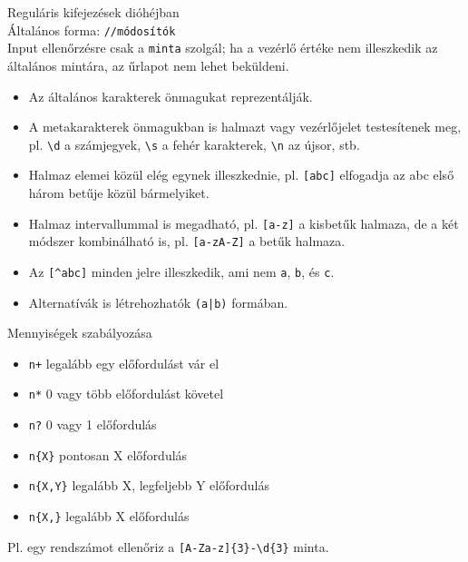 \begin{frame}
  Reguláris kifejezések dióhéjban\\
  \vfill
  Általános forma: \texttt{//módosítók}\\
  Input ellenőrzésre csak a \texttt{minta} szolgál; ha a vezérlő értéke nem illeszkedik az általános mintára, az űrlapot nem lehet beküldeni.\\
  \begin{itemize}
    \item Az általános karakterek önmagukat reprezentálják.
    \item A metakarakterek önmagukban is halmazt vagy vezérlőjelet testesítenek meg, pl. \texttt{\textbackslash d} a számjegyek, \texttt{\textbackslash s} a fehér karakterek, \texttt{\textbackslash n} az újsor, stb.
    \item Halmaz elemei közül elég egynek illeszkednie, pl. \texttt{[abc]} elfogadja az abc első három betűje közül bármelyiket.
    \item Halmaz intervallummal is megadható, pl. \texttt{[a-z]} a kisbetűk halmaza, de a két módszer kombinálható is, pl. \texttt{[a-zA-Z]} a betűk halmaza.
    \item Az \texttt{[\textasciicircum abc]} minden jelre illeszkedik, ami nem \texttt{a}, \texttt{b}, és \texttt{c}.
    \item Alternatívák is létrehozhatók \texttt{(a|b)} formában.
  \end{itemize}  
\end{frame}

\begin{frame}
  Mennyiségek szabályozása
  \medskip
  \begin{itemize}
    \item \texttt{n+} legalább egy előfordulást vár el
    \item \texttt{n*} 0 vagy több előfordulást követel
    \item \texttt{n?} 0 vagy 1 előfordulás
    \item \texttt{n\{X\}} pontosan X előfordulás
    \item \texttt{n\{X,Y\}} legalább X, legfeljebb Y előfordulás
    \item \texttt{n\{X,\}} legalább X előfordulás
  \end{itemize}
  Pl. egy rendszámot ellenőriz a \texttt{[A-Za-z]\{3\}-\textbackslash d\{3\}} minta. 
  \vfill
\end{frame}


